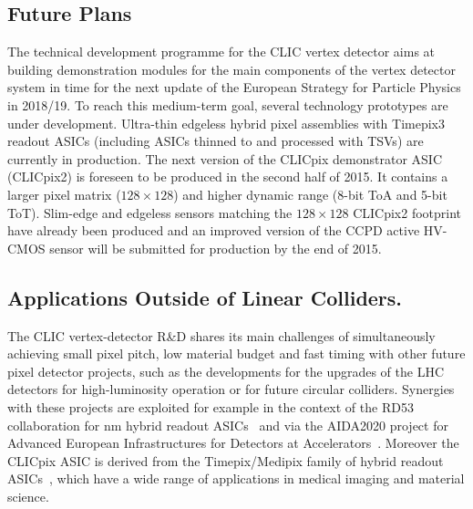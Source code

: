 \subsection{Future Plans}
The technical development programme for the CLIC vertex detector aims at building
demonstration modules for the main components of the vertex detector system
in time for the next update of the European Strategy
for Particle Physics in 2018/19. To reach this medium-term goal, several technology prototypes
are under development.
Ultra-thin edgeless hybrid pixel assemblies with Timepix3 readout ASICs (including ASICs thinned to \unit[50]{\micron}
and processed with TSVs) are currently in production.
The next version of the CLICpix demonstrator
ASIC (CLICpix2) is foreseen to be produced in the second half of 2015. It contains a larger
pixel matrix ($128\times 128$) and higher dynamic range (8-bit ToA and 5-bit ToT).
Slim-edge and edgeless sensors matching the $128\times 128$ CLICpix2 footprint have already been produced and an
improved version of the CCPD active HV-CMOS sensor will be submitted for production by the end of 2015.

\subsection{Applications Outside of Linear Colliders.}
The CLIC vertex-detector R\&D shares its main challenges of simultaneously achieving small pixel pitch,
low material budget and fast timing with other future pixel detector projects, such as the developments for
the upgrades of the LHC detectors for high-luminosity operation or for future circular colliders.
Synergies with these projects are exploited for example in the context of the RD53 collaboration for \unit[65]{nm} hybrid readout
ASICs~\cite{RD53} and via the AIDA2020 project for Advanced European Infrastructures for Detectors at
Accelerators~\cite{AIDA2020}.
Moreover the CLICpix ASIC is derived from the
Timepix/Medipix family of hybrid readout ASICs~\cite{medipix-collaboration}, which have a wide range of applications in
medical imaging and material science.
